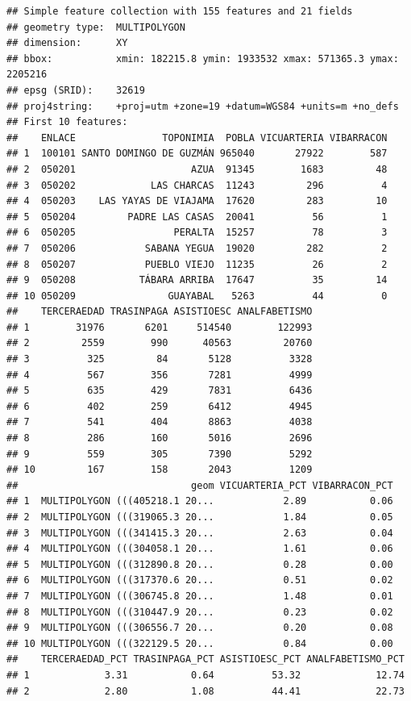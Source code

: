 \documentclass[11pt,]{article}
\begin{document}
\begin{verbatim}
## Simple feature collection with 155 features and 21 fields
## geometry type:  MULTIPOLYGON
## dimension:      XY
## bbox:           xmin: 182215.8 ymin: 1933532 xmax: 571365.3 ymax: 2205216
## epsg (SRID):    32619
## proj4string:    +proj=utm +zone=19 +datum=WGS84 +units=m +no_defs
## First 10 features:
##    ENLACE               TOPONIMIA  POBLA VICUARTERIA VIBARRACON
## 1  100101 SANTO DOMINGO DE GUZMÁN 965040       27922        587
## 2  050201                    AZUA  91345        1683         48
## 3  050202             LAS CHARCAS  11243         296          4
## 4  050203    LAS YAYAS DE VIAJAMA  17620         283         10
## 5  050204         PADRE LAS CASAS  20041          56          1
## 6  050205                 PERALTA  15257          78          3
## 7  050206            SABANA YEGUA  19020         282          2
## 8  050207            PUEBLO VIEJO  11235          26          2
## 9  050208           TÁBARA ARRIBA  17647          35         14
## 10 050209                GUAYABAL   5263          44          0
##    TERCERAEDAD TRASINPAGA ASISTIOESC ANALFABETISMO
## 1        31976       6201     514540        122993
## 2         2559        990      40563         20760
## 3          325         84       5128          3328
## 4          567        356       7281          4999
## 5          635        429       7831          6436
## 6          402        259       6412          4945
## 7          541        404       8863          4038
## 8          286        160       5016          2696
## 9          559        305       7390          5292
## 10         167        158       2043          1209
##                              geom VICUARTERIA_PCT VIBARRACON_PCT
## 1  MULTIPOLYGON (((405218.1 20...            2.89           0.06
## 2  MULTIPOLYGON (((319065.3 20...            1.84           0.05
## 3  MULTIPOLYGON (((341415.3 20...            2.63           0.04
## 4  MULTIPOLYGON (((304058.1 20...            1.61           0.06
## 5  MULTIPOLYGON (((312890.8 20...            0.28           0.00
## 6  MULTIPOLYGON (((317370.6 20...            0.51           0.02
## 7  MULTIPOLYGON (((306745.8 20...            1.48           0.01
## 8  MULTIPOLYGON (((310447.9 20...            0.23           0.02
## 9  MULTIPOLYGON (((306556.7 20...            0.20           0.08
## 10 MULTIPOLYGON (((322129.5 20...            0.84           0.00
##    TERCERAEDAD_PCT TRASINPAGA_PCT ASISTIOESC_PCT ANALFABETISMO_PCT
## 1             3.31           0.64          53.32             12.74
## 2             2.80           1.08          44.41             22.73

\end{verbatim}
\end{document}
